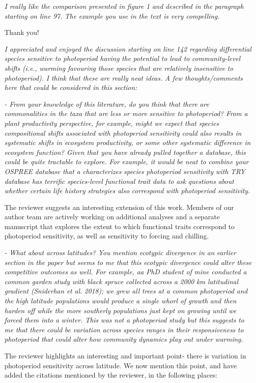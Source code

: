 \documentclass{article}
\begin{document}
\par \emph{I really like the comparison presented in figure 1 and described in the paragraph starting on line 97. The example you use in the text is very compelling. }
\par Thank you!
\par \emph{I appreciated and enjoyed the discussion starting on line 142 regarding differential species sensitive to photoperiod having the potential to lead to community-level shifts (i.e., warming favouring those species that are relatively insensitive to photoperiod). I think that these are really neat ideas. A few thoughts/comments here that could be considered in this section: }
\par \emph{- From your knowledge of this literature, do you think that there are commonalities in the taxa that are less or more sensitive to photoperiod? From a plant productivity perspective, for example, might we expect that species compositional shifts associated with photoperiod sensitivity could also results in systematic shifts in ecosystem productivity, or some other systematic difference in ecosystem function? Given that you have already pulled together a database, this could be quite tractable to explore. For example, it would be neat to combine your OSPREE database that a characterizes species photoperiod sensitivity with TRY database has terrific species-level functional trait data to ask questions about whether certain life history strategies also correspond with photoperiod sensitivity. }
\par The reviewer suggests an interesting extension of this work. Members of our author team are actively working on additional analyses and a separate manuscript that explores the extent to which functional traits correspond to photoperiod sensitivity, as well as sensitivity to forcing and chilling. 
\par \emph{- What about across latitudes? You mention ecotypic divergence in an earlier section in the paper but seems to me that this ecotypic divergence could alter these competitive outcomes as well. For example, aa PhD student of mine conducted a common garden study with black spruce collected across a 2000 km latitudinal gradient (Sniderhan et al. 2018); we grew all trees at a common photoperiod and the high latitude populations would produce a single whorl of growth and then harden off while the more southerly populations just kept on growing until we forced them into a winter. This was not a photoperiod study but this suggests to me that there could be variation across species ranges in their responsiveness to photoperiod that could alter how community dynamics play out under warming.}
\par The reviewer highlights an interesting and important point- there is variation in photoperiod sensitivity across latitude. We now mention this point, and have added the citations mentioned by the reviewer, in the following places:
\end{document}
